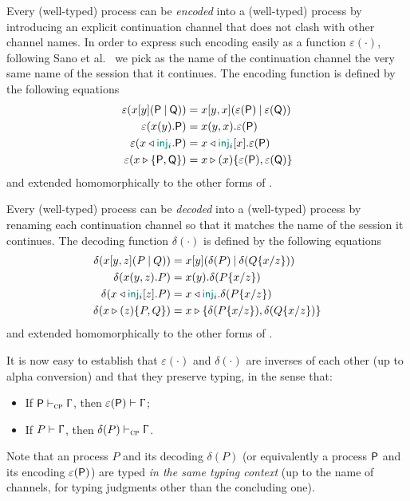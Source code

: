 \newcommand\encode[1]{\varepsilon(#1)}
\newcommand\decode[1]{\delta(#1)}

Every (well-typed) \CP process can be \emph{encoded} into a (well-typed) \LCC
process by introducing an explicit continuation channel that does not clash with
other channel names. In order to express such encoding easily as a function
$\encode\cdot$, following Sano et al.~\cite{SanoKavanaghPientka23} we pick as
the name of the continuation channel the very same name of the session that it
continues. The encoding function is defined by the following equations
\begin{align*}
    \encode{\Fork\x\y{}\ClassicalP\ClassicalQ} & = \Fork\x\y\x{\encode\ClassicalP}{\encode\ClassicalQ} \\
    \encode{\Join\x\y{}.\ClassicalP} & = \Join\x\y\x.\encode\ClassicalP \\
    \encode{\Select\x{\InTag_i}{}.\ClassicalP} & = \Select\x{\InTag_i}\x.\encode\ClassicalP \\
    \encode{\Case\x{}\ClassicalP\ClassicalQ} & = \Case\x\x{\encode\ClassicalP}{\encode\ClassicalQ}
\end{align*}
and extended homomorphically to the other forms of \CP.

Every (well-typed) \LCC process can be \emph{decoded} into a (well-typed) \CP
process by renaming each continuation channel so that it matches the name of the
session it continues. The decoding function $\decode\cdot$ is defined by the
following equations
\begin{align*}
    \decode{\Fork\x\y\z{P}{Q}} & = \Fork\x\y{}{\decode{P}}{\decode{Q\subst\x\z}} \\
    \decode{\Join\x\y\z.P} & = \Join\x\y{}.\decode{P\subst\x\z} \\
    \decode{\Select\x{\InTag_i}\z.P} & = \Select\x{\InTag_i}{}.\decode{P\subst\x\z} \\
    \decode{\Case\x\z{P}{Q}} & = \Case\x{}{\decode{P\subst\x\z}}{\decode{Q\subst\x\z}}
\end{align*}
and extended homomorphically to the other forms of \LCC.

It is now easy to establish that $\encode\cdot$ and $\decode\cdot$ are inverses
of each other (up to alpha conversion) and that they preserve typing, in the
sense that:
\begin{itemize}
\item If $\wtcp\ClassicalP\Context$, then $\wtp{\encode\ClassicalP}\Context$;
\item If $\wtp{P}\Context$, then $\wtcp{\decode{P}}\Context$.
\end{itemize}

Note that an \LCC process $P$ and its decoding $\decode{P}$ (or equivalently a
\CP process $\mathsf{P}$ and its encoding $\encode\ClassicalP$) are typed
\emph{in the same typing context} (up to the name of channels, for typing
judgments other than the concluding one).
